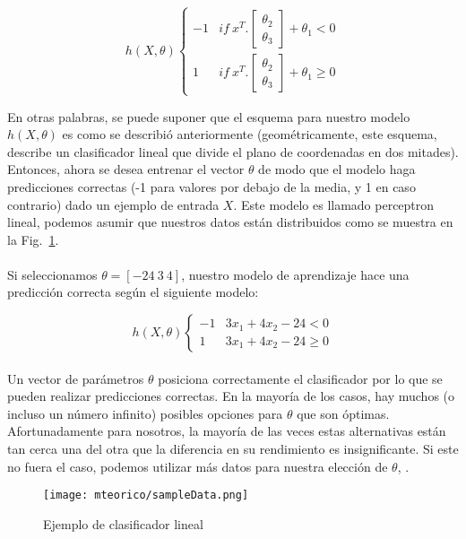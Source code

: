     \begin{equation}
        h(X,\theta)\begin{cases}-1 & if\ x^T.\begin{bmatrix}\theta_2\\\theta_3 \end{bmatrix}+\theta_1< 0\\1 & if\ x^T.\begin{bmatrix}\theta_2\\\theta_3 \end{bmatrix}+\theta_1 \geq 0\end{cases}
    \end{equation}

    En otras palabras, se puede suponer que el esquema para nuestro modelo $h(X,\theta)$ es como se describió anteriormente (geométricamente, este esquema, describe un clasificador lineal que divide el plano de coordenadas en dos mitades). Entonces, ahora se desea entrenar el vector $\theta$ de modo que el modelo haga predicciones correctas (-1 para valores por debajo de la media, y 1 en caso contrario) dado un ejemplo de entrada $X$. Este modelo es llamado perceptron lineal, podemos asumir que nuestros datos están distribuidos como se muestra en la Fig.~\ref{fig:sdata}.
    \\\\
    Si seleccionamos $\theta=[-24\ 3\ 4]$, nuestro modelo de aprendizaje hace una predicción correcta según el siguiente modelo:

    \begin{equation}
        h(X,\theta)\begin{cases}-1 & 3x_1+ 4x_2-24< 0\\
        1 &  3x_1+ 4x_2-24 \geq 0\end{cases}
    \end{equation}
    \\
    Un vector de parámetros $\theta$ posiciona correctamente el clasificador por lo que se pueden realizar predicciones correctas. En la mayoría de los casos, hay muchos (o incluso un número infinito) posibles opciones para $\theta$ que son óptimas. Afortunadamente para nosotros, la mayoría de las veces estas alternativas están tan cerca una del otra que la diferencia en su rendimiento es insignificante. Si este no fuera el caso, podemos utilizar más datos para nuestra elección de $\theta$, \cite{dlBook}.
    \begin{figure}[htp]
        \centering
        \texttt{[image: mteorico/sampleData.png]}
        \caption{Ejemplo de clasificador lineal}
        \label{fig:sdata}
    \end{figure}

